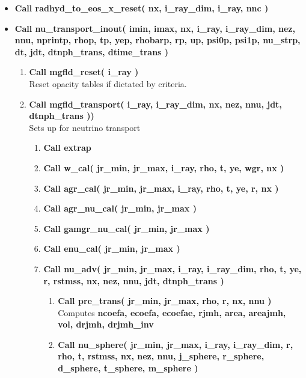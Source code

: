 \documentclass[11pt,doublespace]{article}
\begin{document}
\begin{itemize}
\item {\bf Call radhyd\_to\_eos\_x\_reset( nx, i\_ray\_dim, i\_ray, nnc )}

\item {\bf Call nu\_transport\_inout( imin, imax, nx, i\_ray, i\_ray\_dim, nez, nnu, nprintp, rhop, tp, yep, rhobarp, rp, up, psi0p, psi1p, nu\_strp, dt, jdt, dtnph\_trans, dtime\_trans ) }

\begin{enumerate}

\item {\bf  Call mgfld\_reset( i\_ray )}\\
Reset opacity tables if dictated by criteria. 

\item {\bf  Call mgfld\_transport( i\_ray, i\_ray\_dim, nx, nez, nnu, jdt, dtnph\_trans ))}\\
Sets up for neutrino transport

\begin{enumerate}

\item {\bf  Call extrap}

\item {\bf Call w\_cal( jr\_min, jr\_max, i\_ray, rho, t, ye, wgr, nx )}

\item {\bf Call agr\_cal( jr\_min, jr\_max, i\_ray, rho, t, ye, r, nx )}

\item {\bf Call agr\_nu\_cal( jr\_min, jr\_max )}

\item {\bf Call gamgr\_nu\_cal( jr\_min, jr\_max )}

\item {\bf Call enu\_cal( jr\_min, jr\_max )}

\item {\bf Call nu\_adv( jr\_min, jr\_max, i\_ray, i\_ray\_dim, rho, t, ye, r, rstmss, nx,  nez, nnu, jdt, dtnph\_trans )}

\begin{enumerate}

\item {\bf Call pre\_trans( jr\_min, jr\_max, rho, r, nx, nnu )}\\
Computes {\bf ncoefa, ecoefa, ecoefae, rjmh, area, areajmh, vol, drjmh, drjmh\_inv}

\item {\bf Call nu\_sphere( jr\_min, jr\_max, i\_ray, i\_ray\_dim, r, rho, t, rstmss, nx, nez, nnu, j\_sphere, r\_sphere, d\_sphere, t\_sphere, m\_sphere )}\\


\end{enumerate}
\end{enumerate}
\end{enumerate}
\end{itemize}
\end{document}
